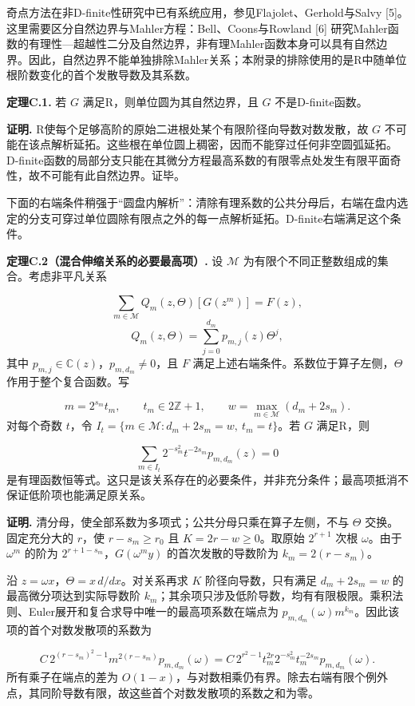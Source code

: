 \documentclass[UTF8,11pt,fontset=fandol]{ctexart}
\begin{document}
奇点方法在非D-finite性研究中已有系统应用，参见Flajolet、Gerhold与Salvy [5]。这里需要区分自然边界与Mahler方程：Bell、Coons与Rowland [6] 研究Mahler函数的有理性—超越性二分及自然边界，非有理Mahler函数本身可以具有自然边界。因此，自然边界不能单独排除Mahler关系；本附录的排除使用的是R中随单位根阶数变化的首个发散导数及其系数。

\textbf{定理C.1.} 若 $G$ 满足R，则单位圆为其自然边界，且 $G$ 不是D-finite函数。

\textbf{证明.} R使每个足够高阶的原始二进根处某个有限阶径向导数对数发散，故 $G$ 不可能在该点解析延拓。这些根在单位圆上稠密，因而不能穿过任何非空圆弧延拓。D-finite函数的局部分支只能在其微分方程最高系数的有限零点处发生有限平面奇性，故不可能有此自然边界。证毕。

下面的右端条件稍强于“圆盘内解析”：清除有理系数的公共分母后，右端在盘内选定的分支可穿过单位圆除有限点之外的每一点解析延拓。D-finite右端满足这个条件。

\textbf{定理C.2（混合伸缩关系的必要最高项）.} 设 $\mathcal M$ 为有限个不同正整数组成的集合。考虑非平凡关系

\[
\sum_{m\in\mathcal M}Q_m(z,\Theta)[G(z^m)]=F(z),
\]
\[
Q_m(z,\Theta)=\sum_{j=0}^{d_m}p_{m,j}(z)\Theta^j,
\]
其中 $p_{m,j}\in\mathbb C(z)$，$p_{m,d_m}\ne0$，且 $F$ 满足上述右端条件。系数位于算子左侧，$\Theta$ 作用于整个复合函数。写

\[
m=2^{s_m}t_m,\qquad t_m\in2\mathbb Z+1,\qquad w=\max_{m\in\mathcal M}(d_m+2s_m).
\]
对每个奇数 $t$，令 $I_t=\{m\in\mathcal M:d_m+2s_m=w,\ t_m=t\}$。若 $G$ 满足R，则

\[
\sum_{m\in I_t}2^{-s_m^2}t^{-2s_m}p_{m,d_m}(z)=0
\]
是有理函数恒等式。这只是该关系存在的必要条件，并非充分条件；最高项抵消不保证低阶项也能满足原关系。

\textbf{证明.} 清分母，使全部系数为多项式；公共分母只乘在算子左侧，不与 $\Theta$ 交换。固定充分大的 $r$，使 $r-s_m\ge r_0$ 且 $K=2r-w\ge0$。取原始 $2^{r+1}$ 次根 $\omega$。由于 $\omega^m$ 的阶为 $2^{r+1-s_m}$，$G(\omega^m y)$ 的首次发散的导数阶为 $k_m=2(r-s_m)$。

沿 $z=\omega x$，$\Theta=x\,d/dx$。对关系再求 $K$ 阶径向导数，只有满足 $d_m+2s_m=w$ 的最高微分项达到实际导数阶 $k_m$；其余项只涉及低阶导数，均有有限极限。乘积法则、Euler展开和复合求导中唯一的最高项系数在端点为 $p_{m,d_m}(\omega)m^{k_m}$。因此该项的首个对数发散项的系数为

\[
C\,2^{(r-s_m)^2-1}m^{2(r-s_m)}p_{m,d_m}(\omega)
=C\,2^{r^2-1}t_m^{2r}2^{-s_m^2}t_m^{-2s_m}p_{m,d_m}(\omega).
\]
所有乘子在端点的差为 $O(1-x)$，与对数相乘仍有界。除去右端有限个例外点，其同阶导数有限，故这些首个对数发散项的系数之和为零。
\end{document}
